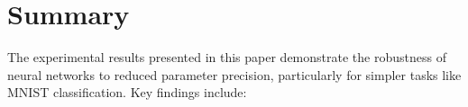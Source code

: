 \documentclass[11pt]{article}
\begin{document}
\section{Summary}


The experimental results presented in this paper demonstrate the robustness of
neural networks to reduced parameter precision, particularly for simpler tasks
like MNIST classification. Key findings include:
\end{document}
